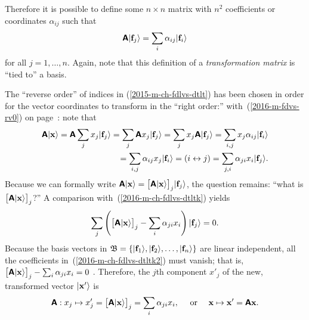 Therefore it is possible to define some $n \times n$ matrix with $n^2$ coefficients or coordinates
$\alpha_{ij}$ such that
\begin{equation}
\textsf{\textbf{A}}\vert  {\bf f}_j \rangle = \sum_i \alpha_{ij}\vert {\bf f}_i  \rangle
\label{2015-m-ch-fdlvs-dtlt}
\end{equation}
for all $j=1,\ldots ,n$.
Again, note that this definition of a {\em transformation matrix}
is ``tied to'' a basis.


The ``reverse order'' of indices in (\ref{2015-m-ch-fdlvs-dtlt}) has been chosen
in order for the vector coordinates to transform in the ``right order:''
with~(\ref{2016-m-fdvs-rv0}) on page~\pageref{2016-m-fdvs-rv0}: note that
\begin{equation}
\begin{split}
\textsf{\textbf{A}}\vert  {\bf x} \rangle =
\textsf{\textbf{A}} \sum_j x_j \vert  {\bf f}_j \rangle =
\sum_j \textsf{\textbf{A}} x_j \vert  {\bf f}_j \rangle =
\sum_j x_j \textsf{\textbf{A}} \vert  {\bf f}_j \rangle =
\sum_{i,j} x_j \alpha_{ij} \vert  {\bf f}_i \rangle  \\
= \sum_{i,j} \alpha_{ij}  x_j \vert  {\bf f}_i \rangle =
(i\leftrightarrow j) =
\sum_{j,i} \alpha_{ji}  x_i \vert  {\bf f}_j \rangle .
\end{split}
\label{2016-m-ch-fdlvs-dtltk}
\end{equation}
Because we can formally write
$\textsf{\textbf{A}}\vert  {\bf x} \rangle = \big[\textsf{\textbf{A}}\vert  {\bf x} \rangle\big]_j \vert  {\bf f}_j \rangle$,
the question remains: ``what is $\big[\textsf{\textbf{A}}\vert  {\bf x} \rangle\big]_j$?''
A comparison with~(\ref{2016-m-ch-fdlvs-dtltk}) yields
\begin{equation}
\begin{split}
\sum_j
\left(
\big[\textsf{\textbf{A}}\vert  {\bf x} \rangle\big]_j
-
\sum_{i} \alpha_{ji}  x_i
\right)
\vert  {\bf f}_j \rangle
=0
 .
\end{split}
\label{2016-m-ch-fdlvs-dtltk2}
\end{equation}
Because the basis vectors  in
${\frak B}=\{\vert {\bf f}_1 \rangle ,\vert {\bf f}_2 \rangle,\ldots ,\vert {\bf f}_n \rangle\}$
are linear independent, all  the coefficients
in~(\ref{2016-m-ch-fdlvs-dtltk2})
must vanish; that is, $\big[\textsf{\textbf{A}}\vert  {\bf x} \rangle\big]_j
-
\sum_{i} \alpha_{ji}  x_i    =0$ . Therefore, the $j$th component $x'_j$ of the new, transformed vector $\vert {\bf x}' \rangle$
is
\begin{equation}
\textsf{\textbf{A}}: x_j \mapsto x'_j =
\big[\textsf{\textbf{A}}\vert  {\bf x} \rangle\big]_j  = \sum_{i} \alpha_{ji}  x_i,
\quad
\text{ or }
\quad
{\bf x} \mapsto {\bf x}' =
\textsf{\textbf{A}} {\bf x}
.
\label{2016-m-ch-fdlvs-dtltk1}
\end{equation}


